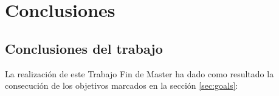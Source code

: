 
\chapter{Conclusiones} %
\label{chap:conclusions} %


\section{Conclusiones del trabajo}

La realización de este Trabajo Fin de Master ha dado como resultado la consecución de los objetivos marcados en la sección \ref{sec:goals}:

